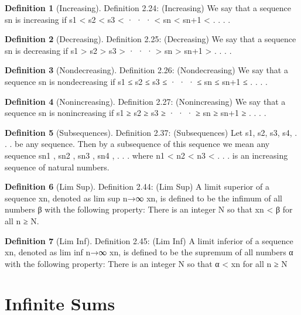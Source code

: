 \documentclass[11pt]{article}
\theoremstyle{definition}
\newtheorem{definition}{Definition}[section]
\begin{document}
\setcounter{definition}{23}
\begin{definition} [Increasing]
	Definition 2.24: (Increasing) We say that a sequence {sn} is increasing if s1 < s2 < s3 < · · · < sn < sn+1 < . . . .	
\end{definition}


\begin{definition} [Decreasing]
	Definition 2.25: (Decreasing) We say that a sequence {sn} is decreasing if	s1 > s2 > s3 > · · · > sn > sn+1 > . . . .
\end{definition}


\begin{definition} [Nondecreasing]
	Definition 2.26: (Nondecreasing) We say that a sequence {sn} is nondecreasing if s1 ≤ s2 ≤ s3 ≤ · · · ≤ sn ≤ sn+1 ≤ . . . .
\end{definition}


\begin{definition} [Nonincreasing]
	Definition 2.27: (Nonincreasing) We say that a sequence {sn} is nonincreasing if s1 ≥ s2 ≥ s3 ≥ · · · ≥ sn ≥ sn+1 ≥ . . . .
\end{definition}

\setcounter{definition}{36}
\begin{definition} [Subsequences]
	Definition 2.37: (Subsequences) Let
	s1, s2, s3, s4, . . .
	be any sequence. Then by a subsequence of this sequence we mean any sequence
	sn1
	, sn2
	, sn3
	, sn4
	, . . .
	where
	n1 < n2 < n3 < . . .
	is an increasing sequence of natural numbers.
\end{definition}

\setcounter{definition}{43}
\begin{definition} [Lim Sup]
	Definition 2.44: (Lim Sup) A limit superior of a sequence {xn}, denoted as
	lim sup
	n→∞
	xn,
	is defined to be the infimum of all numbers β with the following property:
	There is an integer N so that xn < β for all n ≥ N.
\end{definition}


\begin{definition} [Lim Inf]
	Definition 2.45: (Lim Inf) A limit inferior of a sequence {xn}, denoted as
	lim inf
	n→∞
	xn,
	is defined to be the supremum of all numbers α with the following property:
	There is an integer N so that α < xn for all n ≥ N
\end{definition}

\section{Infinite Sums}
\end{document}
